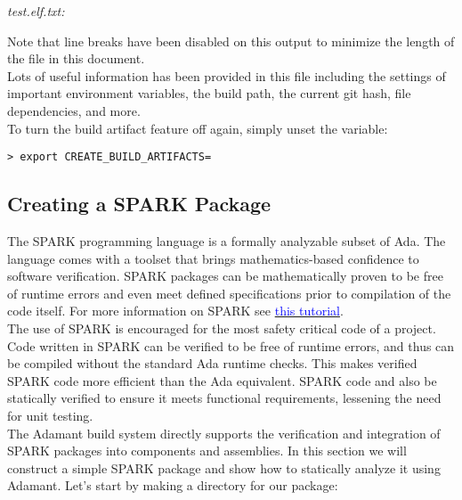 \textit{test.elf.txt:}

Note that line breaks have been disabled on this output to minimize the length of the file in this document. \\

Lots of useful information has been provided in this file including the settings of important environment variables, the build path, the current git hash, file dependencies, and more.  \\

To turn the build artifact feature off again, simply unset the variable:

\vspace{5mm} %
\begin{verbatim}
> export CREATE_BUILD_ARTIFACTS=
\end{verbatim}
\vspace{5mm} %

\subsection{Creating a SPARK Package} \label{Creating a SPARK Package}

The SPARK programming language is a formally analyzable subset of Ada. The language comes with a toolset that brings mathematics-based confidence to software verification. SPARK packages can be mathematically proven to be free of runtime errors and even meet defined specifications prior to compilation of the code itself. For more information on SPARK see \href{https://learn.adacore.com/courses/intro-to-spark/index.html}{\textcolor{blue}{this tutorial}}. \\ 

The use of SPARK is encouraged for the most safety critical code of a project. Code written in SPARK can be verified to be free of runtime errors, and thus can be compiled without the standard Ada runtime checks. This makes verified SPARK code more efficient than the Ada equivalent. SPARK code and also be statically verified to ensure it meets functional requirements, lessening the need for unit testing. \\

The Adamant build system directly supports the verification and integration of SPARK packages into components and assemblies. In this section we will construct a simple SPARK package and show how to statically analyze it using Adamant. Let's start by making a directory for our package:

